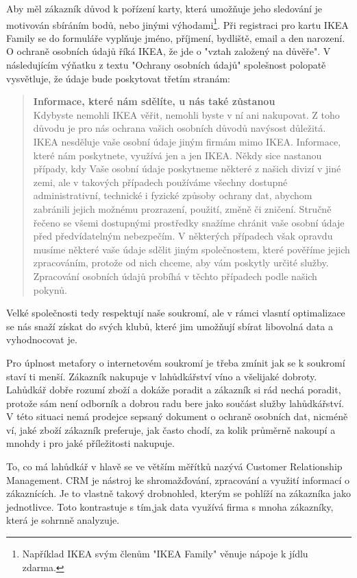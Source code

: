 \documentclass[bc,female,java,dept456]{diploma}						%
\begin{document}
Aby měl zákazník důvod k pořízení karty, která umožňuje jeho sledování je motivován sbíráním bodů, nebo jinými výhodami\footnote{Například IKEA svým členům "IKEA Family" věnuje nápoje k jídlu zdarma.}. Při registraci pro kartu IKEA Family se do formuláře vyplňuje jméno, příjmení, bydliště, email a den narození. O ochraně osobních údajů říká IKEA, že jde o "vztah založený na důvěře". V následujícím výňatku z textu "Ochrany osobních údajů" spolešnost polopatě vysvětluje, že údaje bude poskytovat třetím stranám:

\begin{quote}
{\bf Informace, které nám sdělíte, u nás také zůstanou}\\
Kdybyste nemohli IKEA věřit, nemohli byste v ní ani nakupovat. Z toho důvodu je pro nás ochrana vašich osobních důvodů navýsost důležitá. IKEA nesděluje vaše osobní údaje jiným firmám mimo IKEA. Informace, které nám poskytnete, využívá jen a jen IKEA. Někdy sice nastanou případy, kdy Vaše osobní údaje poskytneme některé z našich divizí v jiné zemi, ale v takových případech používáme všechny dostupné administrativní, technické i fyzické způsoby ochrany dat, abychom zabránili jejich možnému prozrazení, použití, změně či zničení. Stručně řečeno se všemi dostupnými prostředky snažíme chránit vaše osobní údaje před předvídatelným nebezpečím. V některých případech však opravdu musíme některé vaše údaje sdělit jiným společnostem, které pověříme jejich zpracováním, protože od nich chceme, aby vám poskytly určité služby. Zpracování osobních údajů probíhá v těchto případech podle našich pokynů. 
\end{quote}

Velké společnosti tedy respektují naše soukromí, ale v rámci vlasntí optimalizace se nás snaží získat do svých klubů, které jim umožňují sbírat libovolná data a vyhodnocovat je.

Pro úplnost metafory o internetovém soukromí je třeba zmínit jak se k soukromí staví ti menší. Zákazník nakupuje v lahůdkářství víno a všelijaké dobroty. Lahůdkář dobře rozumí zboží a dokáže poradit a zákazník si rád nechá poradit,  protože sám není odborník a dobrou radu bere jako součást služby lahůdkářství. V této situaci nemá prodejce sepsaný dokument o ochraně osobních dat, nicméně ví, jaké zboží zákazník preferuje, jak často chodí, za kolik průměrně nakoupí a mnohdy i pro jaké příležitosti nakupuje.

To, co má lahůdkář v hlavě se ve větším měřítků nazývá Customer Relationship Management. CRM je nástroj ke shromažďování, zpracování a využití informací o zákaznících. Je to vlastně takový drobnohled, kterým se pohlíží na zákazníka jako jednotlivce. Toto kontrastuje s tím,jak data využívá firma s mnoha zákazníky, která je sohrnně analyzuje.
\end{document}
